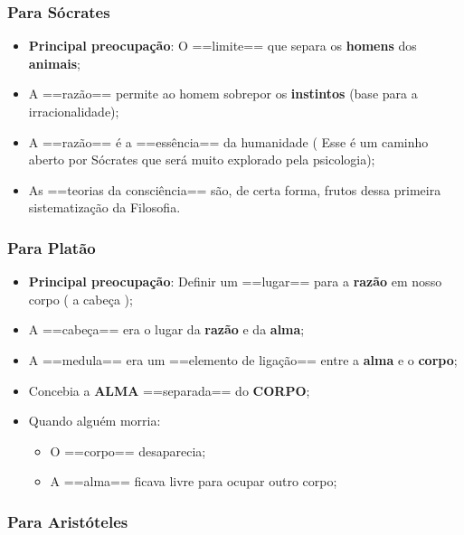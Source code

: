 \documentclass[
]{book}
\providecommand{\tightlist}{%
  \setlength{\itemsep}{0pt}\setlength{\parskip}{0pt}}
\theoremstyle{definition}
\theoremstyle{definition}
\theoremstyle{definition}
\theoremstyle{definition}
\theoremstyle{remark}
\begin{document}
\hypertarget{para-suxf3crates}{%
\subsubsection{Para Sócrates}\label{para-suxf3crates}}

\begin{itemize}
\tightlist
\item
  \textbf{Principal preocupação}: O ==limite== que separa os \textbf{homens} dos \textbf{animais};
\item
  A ==razão== permite ao homem sobrepor os \textbf{instintos} (base para a irracionalidade);
\item
  A ==razão== é a ==essência== da humanidade ( Esse é um caminho aberto por Sócrates que será muito explorado pela psicologia);
\item
  As ==teorias da consciência== são, de certa forma, frutos dessa primeira sistematização da Filosofia.
\end{itemize}

\hypertarget{para-platuxe3o}{%
\subsubsection{Para Platão}\label{para-platuxe3o}}

\begin{itemize}
\tightlist
\item
  \textbf{Principal preocupação}: Definir um ==lugar== para a \textbf{razão} em nosso corpo ( a cabeça );
\item
  A ==cabeça== era o lugar da \textbf{razão} e da \textbf{alma};
\item
  A ==medula== era um ==elemento de ligação== entre a \textbf{alma} e o \textbf{corpo};
\item
  Concebia a \textbf{ALMA} ==separada== do \textbf{CORPO};
\item
  Quando alguém morria:

  \begin{itemize}
  \tightlist
  \item
    O ==corpo== desaparecia;
  \item
    A ==alma== ficava livre para ocupar outro corpo;
  \end{itemize}
\end{itemize}

\hypertarget{para-aristuxf3teles}{%
\subsubsection{Para Aristóteles}\label{para-aristuxf3teles}}
\end{document}
